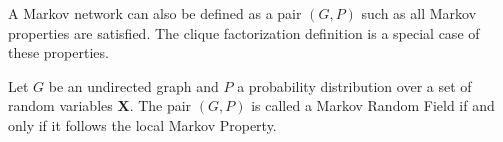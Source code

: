   \begin{remark}
    A Markov network can also be defined as a pair \((G, P)\) such as all Markov
    properties are satisfied. The clique factorization definition is a special
    case of these properties.
  \end{remark}


  \begin{definition}
    Let \(G\) be an undirected graph and \(P\) a probability distribution over a
    set of random variables \(\bm{X}\). The pair \((G, P)\) is called a Markov
    Random Field if and only if it follows the local Markov Property.


  \end{definition}
